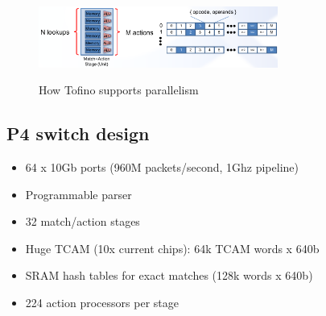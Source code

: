 \documentclass[11pt,oneside,a4paper]{article}
\begin{document}
\begin{figure}[hb]
	\centering
	\includegraphics[width=0.7\textwidth,scale=1]{figures/tofino_parallelism_phv}
	\label{fig:tofino_parallelism_phv}
	\caption{How Tofino supports parallelism \cite{barefoot}}
\end{figure}

\newpage

\subsection{P4 switch design}


\begin{itemize}
	\setlength{\itemsep}{0pt}
	\setlength{\parskip}{0pt}
	\item 64 x 10Gb ports (960M packets/second, 1Ghz pipeline)
	\item Programmable parser
	\item 32 match/action stages
	\item Huge TCAM (10x current chips): 64k TCAM words x 640b
	\item SRAM hash tables for exact matches (128k words x 640b)
	\item 224 action processors per stage
\end{itemize}
\vspace{-\topsep}










\label{lastpage} %
\clearpage
{}



\clearpage
\appendix
{}
\end{document}
